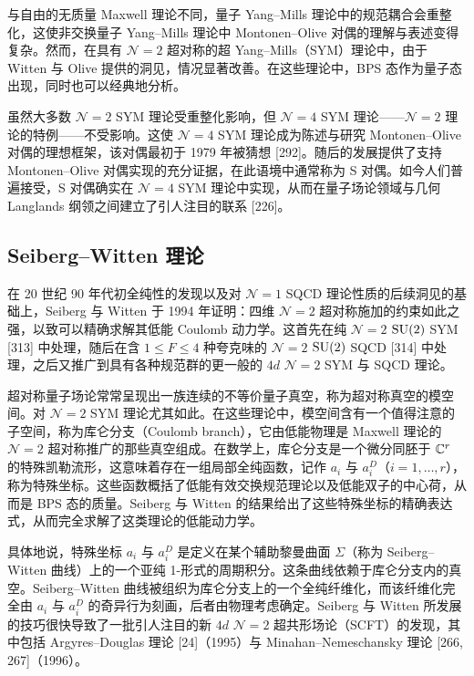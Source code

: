 与自由的无质量 Maxwell 理论不同，量子 Yang--Mills 理论中的规范耦合会重整化，这使非交换量子 Yang--Mills 理论中 Montonen--Olive 对偶的理解与表述变得复杂。然而，在具有 $\mathcal{N}=2$ 超对称的超 Yang--Mills（SYM）理论中，由于 Witten 与 Olive 提供的洞见，情况显著改善。在这些理论中，BPS 态作为量子态出现，同时也可以经典地分析。


虽然大多数 $\mathcal{N}=2$ SYM 理论受重整化影响，但 $\mathcal{N}=4$ SYM 理论——$\mathcal{N}=2$ 理论的特例——不受影响。这使 $\mathcal{N}=4$ SYM 理论成为陈述与研究 Montonen--Olive 对偶的理想框架，该对偶最初于 1979 年被猜想 [292]。随后的发展提供了支持 Montonen--Olive 对偶实现的充分证据，在此语境中通常称为 S 对偶。如今人们普遍接受，S 对偶确实在 $\mathcal{N}=4$ SYM 理论中实现，从而在量子场论领域与几何 Langlands 纲领之间建立了引人注目的联系 [226]。

\subsection*{Seiberg--Witten 理论}

在 20 世纪 90 年代初全纯性的发现以及对 $\mathcal{N}=1$ SQCD 理论性质的后续洞见的基础上，Seiberg 与 Witten 于 1994 年证明：四维 $\mathcal{N}=2$ 超对称施加的约束如此之强，以致可以精确求解其低能 Coulomb 动力学。这首先在纯 $\mathcal{N}=2$ $\operatorname{SU}(2)$ SYM [313] 中处理，随后在含 $1\le F\le 4$ 种夸克味的 $\mathcal{N}=2$ $\operatorname{SU}(2)$ SQCD [314] 中处理，之后又推广到具有各种规范群的更一般的 $4d$ $\mathcal{N}=2$ SYM 与 SQCD 理论。

超对称量子场论常常呈现出一族连续的不等价量子真空，称为超对称真空的模空间。对 $\mathcal{N}=2$ SYM 理论尤其如此。在这些理论中，模空间含有一个值得注意的子空间，称为库仑分支（Coulomb branch），它由低能物理是 Maxwell 理论的 $\mathcal{N}=2$ 超对称推广的那些真空组成。在数学上，库仑分支是一个微分同胚于 $\mathbb{C}^r$ 的特殊凯勒流形，这意味着存在一组局部全纯函数，记作 $a_i$ 与 $a^D_i$（$i=1,\dots,r$），称为特殊坐标。这些函数概括了低能有效交换规范理论以及低能双子的中心荷，从而是 BPS 态的质量。Seiberg 与 Witten 的结果给出了这些特殊坐标的精确表达式，从而完全求解了这类理论的低能动力学。

具体地说，特殊坐标 $a_i$ 与 $a^D_i$ 是定义在某个辅助黎曼曲面 $\Sigma$（称为 Seiberg--Witten 曲线）上的一个亚纯 1-形式的周期积分。这条曲线依赖于库仑分支内的真空。Seiberg--Witten 曲线被组织为库仑分支上的一个全纯纤维化，而该纤维化完全由 $a_i$ 与 $a^D_i$ 的奇异行为刻画，后者由物理考虑确定。Seiberg 与 Witten 所发展的技巧很快导致了一批引人注目的新 $4d$ $\mathcal{N}=2$ 超共形场论（SCFT）的发现，其中包括 Argyres--Douglas 理论 [24]（1995）与 Minahan--Nemeschansky 理论 [266, 267]（1996）。

